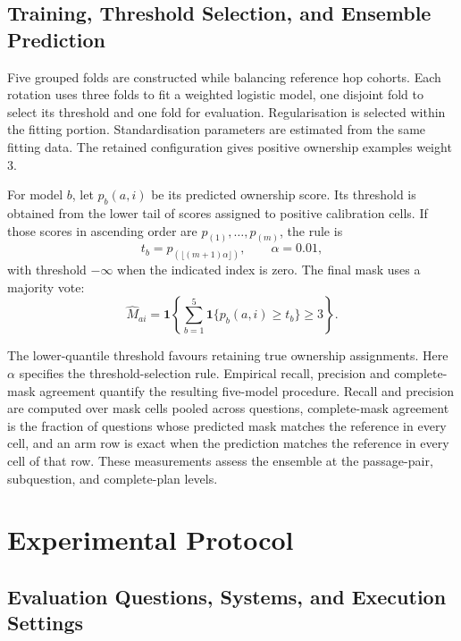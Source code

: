 \subsection{Training, Threshold Selection, and Ensemble Prediction}

Five grouped folds are constructed while balancing reference hop cohorts. Each
rotation uses three folds to fit a weighted logistic model, one disjoint fold
to select its threshold and one fold for evaluation. Regularisation is selected
within the fitting portion. Standardisation parameters are estimated from the
same fitting data. The retained configuration gives positive ownership examples
weight $3$.

For model $b$, let $p_b(a,i)$ be its predicted ownership score. Its threshold
is obtained from the lower tail of scores assigned to positive calibration
cells. If those scores in ascending order are $p_{(1)},\ldots,p_{(m)}$, the
rule is
\begin{equation}
  t_b=p_{(\lfloor(m+1)\alpha\rfloor)},
  \qquad \alpha=0.01,
  \label{eq:ch4-threshold}
\end{equation}
with threshold $-\infty$ when the indicated index is zero. The final mask uses
a majority vote:
\begin{equation}
  \widehat M_{ai}
  =\mathbf{1}\left\{
      \sum_{b=1}^{5}\mathbf{1}\{p_b(a,i)\geq t_b\}\geq3
    \right\}.
  \label{eq:ch4-vote}
\end{equation}

The lower-quantile threshold favours retaining true ownership assignments.
Here $\alpha$ specifies the threshold-selection rule. Empirical recall,
precision and complete-mask agreement quantify the resulting five-model
procedure. Recall and precision are computed over mask cells pooled across
questions, complete-mask agreement is the fraction of questions whose predicted
mask matches the reference in every cell, and an arm row is exact when the
prediction matches the reference in every cell of that row. These measurements
assess the ensemble at the passage-pair, subquestion, and complete-plan levels.

\section{Experimental Protocol}
\label{sec:ch4-protocol}

\subsection{Evaluation Questions, Systems, and Execution Settings}

